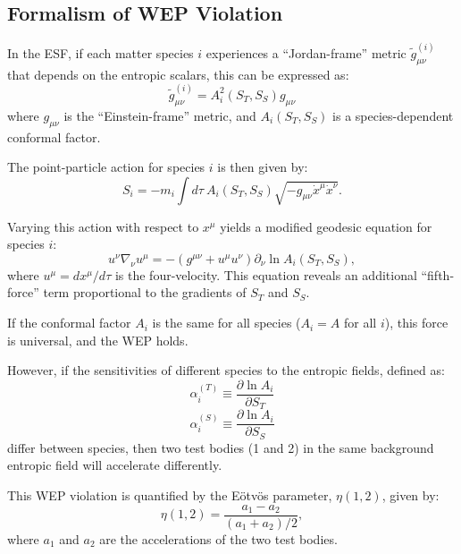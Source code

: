 \documentclass[12pt, a4paper]{article}
\begin{document}
\subsection{Formalism of WEP Violation}\label{sec:wep_formalism}

In the ESF, if each matter species $i$ experiences a ``Jordan-frame'' metric $\tilde{g}_{\mu\nu}^{(i)}$ that depends on the entropic scalars, this can be expressed as:
\begin{equation}
    \tilde{g}_{\mu\nu}^{(i)} = A_i^2(S_T, S_S) g_{\mu\nu}
\end{equation}
where $g_{\mu\nu}$ is the ``Einstein-frame'' metric, and $A_i(S_T,S_S)$ is a species-dependent conformal factor.

The point-particle action for species $i$ is then given by:
\begin{equation}
    S_i = -m_i \int d\tau~ A_i(S_T, S_S) \sqrt{-g_{\mu\nu}\dot{x}^\mu \dot{x}^\nu}.
\end{equation}

Varying this action with respect to $x^\mu$ yields a modified geodesic equation for species $i$:
\begin{equation}
    u^\nu \nabla_\nu u^\mu = - (g^{\mu\nu} + u^\mu u^\nu) \partial_\nu \ln A_i(S_T, S_S),
\end{equation}
where $u^\mu = dx^\mu/d\tau$ is the four-velocity. This equation reveals an additional ``fifth-force'' term proportional to the gradients of $S_T$ and $S_S$.

If the conformal factor $A_i$ is the same for all species ($A_i = A$ for all $i$), this force is universal, and the WEP holds.

However, if the sensitivities of different species to the entropic fields, defined as:
\begin{equation}
    \alpha_i^{(T)} \equiv \frac{\partial \ln A_i}{\partial S_T}
\end{equation}
\begin{equation}
    \alpha_i^{(S)} \equiv \frac{\partial \ln A_i}{\partial S_S}
\end{equation}
differ between species, then two test bodies (1 and 2) in the same background entropic field will accelerate differently.

This WEP violation is quantified by the Eötvös parameter, $\eta(1,2)$, given by:
\begin{equation}
    \eta(1,2) = \frac{a_1 - a_2}{\left( a_1 + a_2 \right)/2},
\end{equation}
where $a_1$ and $a_2$ are the accelerations of the two test bodies.
\end{document}
